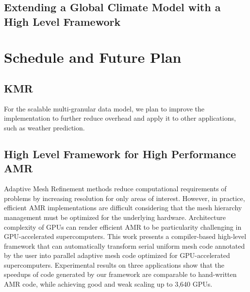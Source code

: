 \documentclass{book}
\begin{document}
\subsection{Extending a Global Climate Model with a High Level Framework}


\section{Schedule and Future Plan}

\subsection{KMR}

For the scalable multi-granular data model, we plan to improve the implementation to further reduce overhead and apply it to other applications, such as weather prediction.


\subsection{High Level Framework for High Performance AMR}
Adaptive Mesh Refinement methods reduce computational requirements of problems by increasing resolution for only areas of interest. However, in practice, efficient AMR implementations are difficult considering that the mesh hierarchy management must be optimized for the underlying hardware. Architecture complexity of GPUs can render efficient AMR to be particularity challenging in GPU-accelerated supercomputers. This work presents a compiler-based high-level framework that can automatically transform serial uniform mesh code annotated by the user into parallel adaptive mesh code optimized for GPU-accelerated supercomputers. Experimental results on three applications show that the speedups of code generated by our framework are comparable to hand-written AMR code, while achieving good and weak scaling up to 3,640 GPUs.
\end{document}
